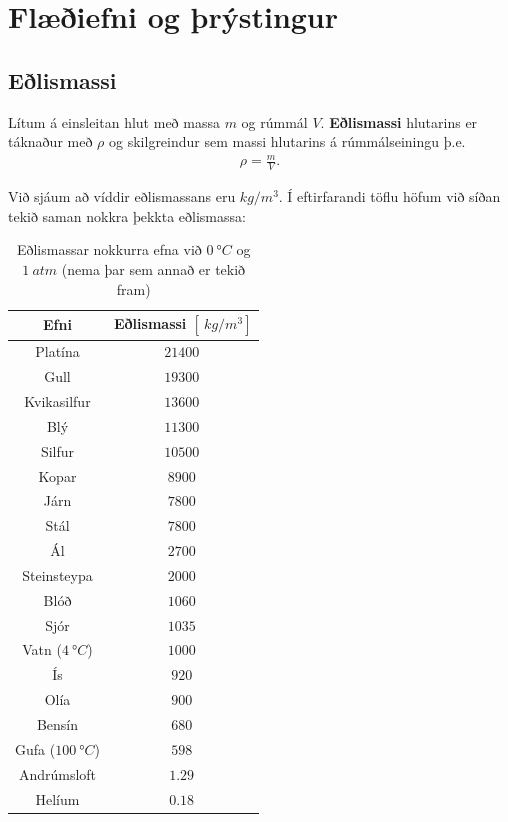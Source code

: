 

\chapter{Flæðiefni og þrýstingur}

\section{Eðlismassi}

\begin{tcolorbox}
\begin{definition}
Lítum á einsleitan hlut með massa $m$ og rúmmál $V$. \textbf{Eðlismassi} hlutarins er táknaður með $\rho$ og skilgreindur sem massi hlutarins á rúmmálseiningu þ.e.
\begin{align*}
    \rho = \frac{m}{V}.
\end{align*}
\end{definition}
\end{tcolorbox}

Við sjáum að víddir eðlismassans eru $\si{kg/m^3}$. Í eftirfarandi töflu höfum við síðan tekið saman nokkra þekkta eðlismassa:

\begin{table}[H]
\begin{center}
\begin{tabular}{|c|c|}
\hline
\textbf{Efni} & \textbf{Eðlismassi $[\SI{}{kg/m^3}]$} \\
\hline
Platína & $\SI{21400}{}$ \\
Gull & $\SI{19300}{}$ \\
Kvikasilfur & $\SI{13600}{}$ \\
Blý & $\SI{11300}{}$ \\
Silfur & $\SI{10500}{}$ \\
Kopar & $\SI{8900}{}$ \\
Járn & $\SI{7800}{}$ \\
Stál & $\SI{7800}{}$ \\
Ál & $\SI{2700}{}$ \\
Steinsteypa & $\SI{2000}{}$ \\
Blóð & $\SI{1060}{}$ \\
Sjór & $\SI{1035}{}$ \\
Vatn ($\SI{4}{\degree C}$) & $\SI{1000}{}$ \\
Ís & $\SI{920}{}$ \\
Olía & $\SI{900}{}$ \\
Bensín & $\SI{680}{}$ \\
Gufa ($\SI{100}{\degree C}$) & $\SI{598}{}$ \\
Andrúmsloft & $\SI{1.29}{}$ \\
Helíum & $\SI{0.18}{}$ \\
\hline
\end{tabular}
\caption{Eðlismassar nokkurra efna við $\SI{0}{\degree C}$ og $\SI{1}{atm}$ (nema þar sem annað er tekið fram)}
\label{tafla:einingakerfi}
\end{center}
\end{table}

